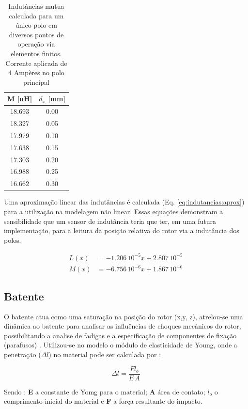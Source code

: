 \begin{table}[ht!]
	\centering
	\begin{tabular}{c c}
        M [uH]  & $d_x$ [mm] \\
        \hline \hline               
         18.693 & 0.00 \\
         18.327 & 0.05 \\
         17.979 & 0.10 \\
         17.638 & 0.15 \\
         17.303 & 0.20 \\
         16.988 & 0.25 \\
         16.662 & 0.30       
	\end{tabular} 
	\caption{Indutâncias mutua calculada para um único polo em diversos pontos de operação via elementos finitos. Corrente aplicada de 4 Ampères no polo principal}
	\label{tab:dinamica:indutancia:mutua} 
\end{table} 

Uma aproximação linear das indutâncias é calculada (Eq. \ref{eq:indutancias:aprox}) para a utilização na modelagem não linear. Essas equações demonstram a sensibilidade que um sensor de indutância teria que ter, em uma futura implementação, para a leitura da posição relativa do rotor via a indutância dos polos.

\begin{align}
	L(x) &= -1.206 \,10^{-5} x + 2.807 \, 10^{-5} \\
	M(x) &= -6.756 \,10^{-6} x + 1.867 \, 10^{-6} 
	\label{eq:indutancias:aprox}
\end{align} 

\subsection{Batente}

O batente atua como uma saturação na posição do rotor (x,y, z), atrelou-se uma dinâmica ao batente para analisar as influências de choques mecânicos do rotor, possibilitando a analise de fadigas e a especificação de componentes de fixação (parafusos) . Utilizou-se no  modelo o módulo de elasticidade de Young, onde a penetração ($\Delta l $) no material pode ser calculada por :

\begin{equation}
	\Delta l =  \frac{F l_o}{E \, A}
\end{equation}

Sendo : \textbf{E }a constante de Yomg para o material; \textbf{A} área de contato; \textbf{$l_o$ } o comprimento inicial do material e \textbf{F} a força resultante do impacto. 


